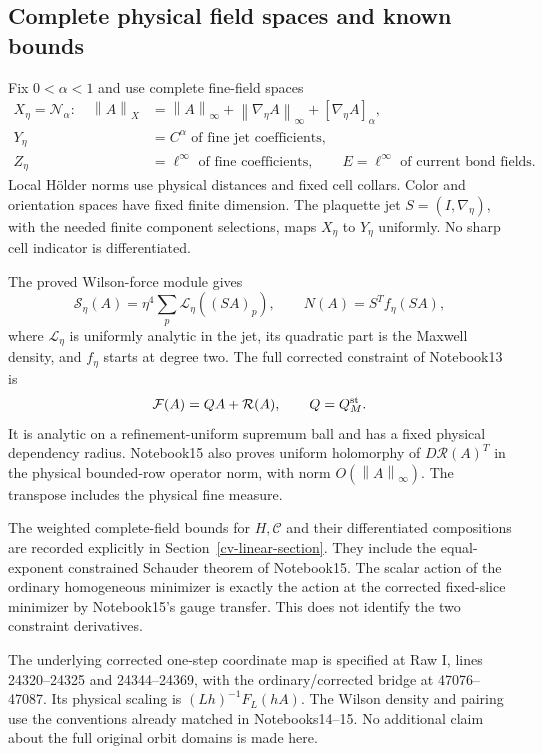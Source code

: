 \documentclass[11pt]{article}
\theoremstyle{remark}
\newcommand{\norm}[1]{\left\|#1\right\|}
\begin{document}
\subsection{Complete physical field spaces and known bounds}
\label{cv-spaces-section}

Fix $0<\alpha<1$ and use complete fine-field spaces
\begin{equation}\label{cv-spaces}
 \begin{split}
 X_\eta=\mathcal N_\alpha:\quad
 \norm A_X&=\norm A_\infty+\norm{\nabla_\eta A}_\infty
                         +[\nabla_\eta A]_\alpha,\\
 Y_\eta&=C^\alpha\text{ of fine jet coefficients},\\
 Z_\eta&=\ell^\infty\text{ of fine coefficients},\qquad
 E=\ell^\infty\text{ of current bond fields}.
 \end{split}
\end{equation}
Local H\"older norms use physical distances and fixed cell
collars. Color and orientation spaces have fixed finite
dimension. The plaquette jet $S=(I,\nabla_\eta)$, with the
needed finite component selections, maps $X_\eta$ to $Y_\eta$
uniformly. No sharp cell indicator is differentiated.

The proved Wilson-force module gives
\[
 \mathcal S_\eta(A)=\eta^4\sum_p\mathcal L_\eta((SA)_p),
 \qquad N(A)=S^Tf_\eta(SA),
\]
where $\mathcal L_\eta$ is uniformly analytic in the jet,
its quadratic part is the Maxwell density, and $f_\eta$ starts
at degree two. The full corrected constraint of Notebook13 is
\[
 \mathcal F(A)=QA+\mathcal R(A),\qquad Q=Q_M^{\rm st}.
\]
It is analytic on a refinement-uniform supremum ball and has
a fixed physical dependency radius. Notebook15 also proves
uniform holomorphy of $D\mathcal R(A)^T$ in the physical
bounded-row operator norm, with norm $O(\norm A_\infty)$.
The transpose includes the physical fine measure.

The weighted complete-field bounds for $H,\mathcal C$ and
their differentiated compositions are recorded explicitly in
Section~\ref{cv-linear-section}. They include the
equal-exponent constrained Schauder theorem of Notebook15.
The scalar action of the ordinary homogeneous minimizer is
exactly the action at the corrected fixed-slice minimizer by
Notebook15's gauge transfer. This does not identify the two
constraint derivatives.

The underlying corrected one-step coordinate map is specified
at Raw I, lines 24320--24325 and 24344--24369, with the
ordinary/corrected bridge at 47076--47087. Its physical
scaling is $(Lh)^{-1}F_L(hA)$. The Wilson density and pairing
use the conventions already matched in Notebooks14--15.
No additional claim about the full original orbit domains is
made here.
\end{document}
